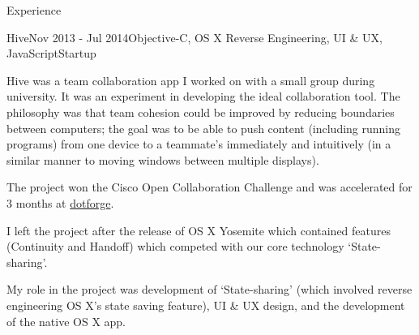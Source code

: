 \documentclass{resume} %
\begin{document}
\begin{rSection}{Experience}

\begin{rSubsection}{Hive}{Nov 2013 - Jul 2014}{Objective-C, OS X Reverse Engineering,  UI \& UX, JavaScript}{Startup}
\item Hive was a team collaboration app I worked on with a small group during university. It was an experiment in developing the ideal collaboration tool. The philosophy was that team cohesion could be improved by reducing boundaries between computers; the goal was to be able to push content (including running programs) from one device to a teammate's immediately and intuitively (in a similar manner to moving windows between multiple displays).
\item The project won the Cisco Open Collaboration Challenge and was accelerated for 3 months at \href{http://www.dotforge.com/}{dotforge}.
\item I left the project after the release of OS X Yosemite which contained features (Continuity and Handoff) which competed with our core technology `State-sharing'.
\item My role in the project was development of `State-sharing' (which involved reverse engineering OS X's state saving feature), UI \& UX design, and the development of the native OS X app.
\end{rSubsection}


\end{rSection}



\end{document}
